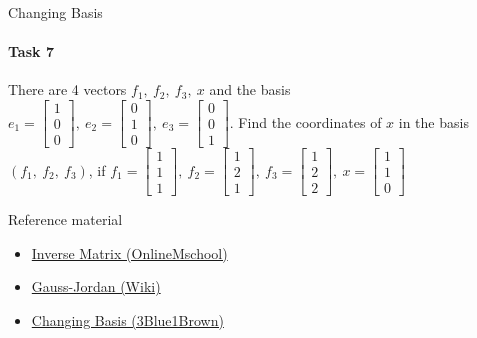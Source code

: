 \documentclass[aspectratio=169]{beamer}
\newcommand{\fbckg}[1]{\usebackgroundtemplate{\texttt{[image: \#1]}}}%
\begin{document}
\begin{frame}[t]{Changing Basis}
    \framesubtitle{Task 7}
    There are 4 vectors $f_1,\ f_2,\ f_3,\ x$ and the basis \\ $e_1=\begin{bmatrix}1\\0\\0\end{bmatrix},\ e_2=\begin{bmatrix}0\\1\\0\end{bmatrix},\ e_3=\begin{bmatrix}0\\0\\1\end{bmatrix}$. Find the coordinates of $x$ in the basis $(f_1,\ f_2,\ f_3)$, if $f_1=\begin{bmatrix}1\\1\\1\end{bmatrix},\ f_2=\begin{bmatrix}1\\2\\1\end{bmatrix},\ f_3=\begin{bmatrix}1\\2\\2\end{bmatrix},\ x=\begin{bmatrix}1\\1\\0\end{bmatrix}$
\end{frame}

\begin{frame}[t]{Reference material}
    \Large
    \begin{itemize}
        \item \href{https://onlinemschool.com/math/library/matrix/inverse/}{Inverse Matrix (OnlineMschool)}
        \item \href{https://en.wikipedia.org/wiki/Gaussian_elimination}{Gauss-Jordan (Wiki)}
        \item \href{https://www.youtube.com/watch?v=P2LTAUO1TdA}{Changing Basis (3Blue1Brown)}
    \end{itemize}
\end{frame}

\fbckg{fibeamer/figs/last_page.png}
\frame[plain]{}

\usebackgroundtemplate{}


\fbckg{fibeamer/figs/common.png}
\end{document}
